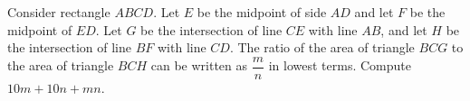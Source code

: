 Consider rectangle $ABCD$. Let $E$ be the midpoint of side $AD$ and let $F$ be the midpoint of $ED$. Let $G$ be the intersection of line $CE$ with line $AB$, and let $H$ be the intersection of line $BF$ with line $CD$. The ratio of the area of triangle $BCG$ to the area of triangle $BCH$ can be written as $\dfrac {m}{n}$ in lowest terms. Compute $10m+10n+mn$.
